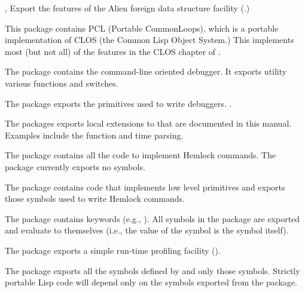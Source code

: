 \begin{Lentry}
\item[\code{alien}, \code{c-call}] Export the features of the Alien
  foreign data structure facility (.)
  
\item[\code{pcl}] This package contains PCL (Portable CommonLoops),
  which is a portable implementation of CLOS (the Common Lisp Object
  System.)  This implements most (but not all) of the features in the
  CLOS chapter of \cltltwo.
  
\item[\code{debug}] The  package contains the command-line
  oriented debugger.  It exports utility various functions and
  switches.
  
\item[\code{debug-internals}] The  package
  exports the primitives used to write debuggers.
  .
  
\item[\code{extensions (ext)}] The  packages exports
  local extensions to \clisp{} that are documented in this manual.
  Examples include the  function and time parsing.
  
\item[\code{hemlock (ed)}] The  package contains all the
  code to implement Hemlock commands.  The  package
  currently exports no symbols.
  
\item[\code{hemlock-internals (hi)}] The 
  package contains code that implements low level primitives and
  exports those symbols used to write Hemlock commands.
  
\item[\code{keyword}] The  package contains keywords
  (e.g., ).  All symbols in the  package are
  exported and evaluate to themselves (i.e., the value of the symbol
  is the symbol itself).
  
\item[\code{profile}] The  package exports a simple
  run-time profiling facility ().
  
\item[\code{common-lisp (cl lisp)}] The  package
  exports all the symbols defined by \cltl{} and only those symbols.
  Strictly portable Lisp code will depend only on the symbols exported
  from the  package.
  

\end{Lentry}
